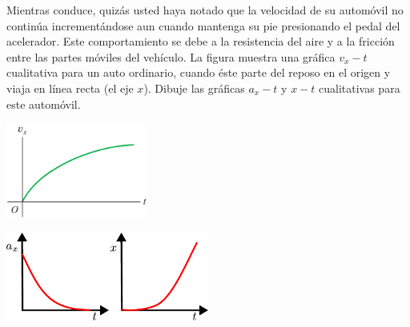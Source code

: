 \documentclass[11pt]{article}
\begin{document}
\begin{exercise}
    \begin{multicols}{2}
Mientras conduce, quizás usted haya notado que la velocidad de su automóvil no continúa incrementándose aun cuando mantenga su pie presionando el pedal del acelerador. Este comportamiento se debe a la resistencia del aire y a la fricción entre las partes móviles del vehículo. La figura muestra una gráfica $v_x - t$ cualitativa para un auto ordinario, cuando éste parte del reposo en el origen y viaja en línea recta (el eje $x$). Dibuje las gráficas $a_x - t$ y $x - t$ cualitativas para este automóvil.
\begin{center}
    \includegraphics[width=0.35\textwidth]{figs/activ-06.png}
\end{center}
    \end{multicols}
\end{exercise}
\begin{solution}
\begin{center}
    \includegraphics[width=0.5\textwidth]{figs/ac-11.pdf}
\end{center}
\end{solution}
\end{document}
